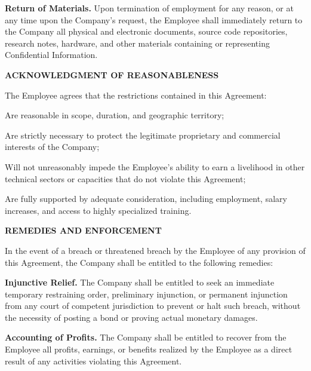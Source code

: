 \documentclass[11pt,a4paper]{article}
\begin{document}
\begin{clauses}
\begin{clauses}
        \item \textbf{Return of Materials.} Upon termination of employment for any reason, or at any time upon the Company's request, the Employee shall immediately return to the Company all physical and electronic documents, source code repositories, research notes, hardware, and other materials containing or representing Confidential Information.
    \end{clauses}

    \item \textbf{ACKNOWLEDGMENT OF REASONABLENESS}
    \label{sec:reasonableness}
    
    The Employee agrees that the restrictions contained in this Agreement:
    
    \begin{clauses}
        \item Are reasonable in scope, duration, and geographic territory;
        \item Are strictly necessary to protect the legitimate proprietary and commercial interests of the Company;
        \item Will not unreasonably impede the Employee's ability to earn a livelihood in other technical sectors or capacities that do not violate this Agreement;
        \item Are fully supported by adequate consideration, including employment, salary increases, and access to highly specialized training.
    \end{clauses}

    \item \textbf{REMEDIES AND ENFORCEMENT}
    \label{sec:remedies}
    
    In the event of a breach or threatened breach by the Employee of any provision of this Agreement, the Company shall be entitled to the following remedies:
    
    \begin{clauses}
        \item \textbf{Injunctive Relief.} The Company shall be entitled to seek an immediate temporary restraining order, preliminary injunction, or permanent injunction from any court of competent jurisdiction to prevent or halt such breach, without the necessity of posting a bond or proving actual monetary damages.
        
        \item \textbf{Accounting of Profits.} The Company shall be entitled to recover from the Employee all profits, earnings, or benefits realized by the Employee as a direct result of any activities violating this Agreement.
        

\end{clauses}
\end{clauses}
\end{document}
